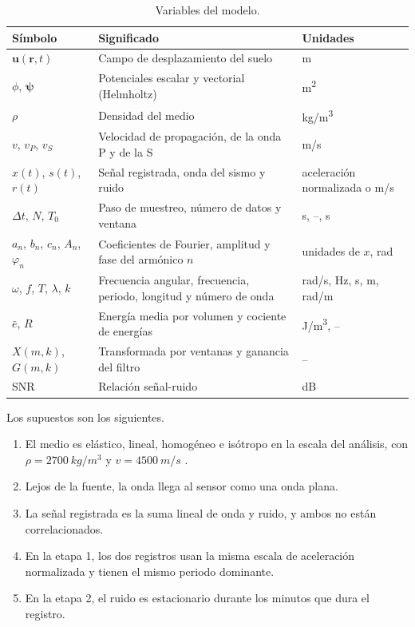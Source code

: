 \documentclass[11pt,letterpaper]{article}
\begin{document}
\begin{table}[H]
\centering
\small
\begin{tabular}{lll}
\toprule
Símbolo & Significado & Unidades\\
\midrule
$\mathbf{u}(\mathbf{r},t)$ & Campo de desplazamiento del suelo & \si{m}\\
$\phi$, $\boldsymbol{\psi}$ & Potenciales escalar y vectorial (Helmholtz) & \si{m^2}\\
$\rho$ & Densidad del medio & \si{kg/m^3}\\
$v$, $v_P$, $v_S$ & Velocidad de propagación, de la onda P y de la S & \si{m/s}\\
$x(t)$, $s(t)$, $r(t)$ & Señal registrada, onda del sismo y ruido & aceleración normalizada o \si{m/s}\\
$\Delta t$, $N$, $T_0$ & Paso de muestreo, número de datos y ventana & \si{s}, --, \si{s}\\
$a_n$, $b_n$, $c_n$, $A_n$, $\varphi_n$ & Coeficientes de Fourier, amplitud y fase del armónico $n$ & unidades de $x$, \si{rad}\\
$\omega$, $f$, $T$, $\lambda$, $k$ & Frecuencia angular, frecuencia, periodo, longitud y número de onda & \si{rad/s}, \si{Hz}, \si{s}, \si{m}, \si{rad/m}\\
$\bar e$, $R$ & Energía media por volumen y cociente de energías & \si{J/m^3}, --\\
$X(m,k)$, $G(m,k)$ & Transformada por ventanas y ganancia del filtro & --\\
SNR & Relación señal-ruido & \si{dB}\\
\bottomrule
\end{tabular}
\caption{Variables del modelo.}
\label{tab:var}
\end{table}

Los supuestos son los siguientes.
\begin{enumerate}
\item El medio es elástico, lineal, homogéneo e isótropo en la escala del análisis, con $\rho = \SI{2700}{kg/m^3}$ y $v = \SI{4500}{m/s}$ \parencite{expediente}.
\item Lejos de la fuente, la onda llega al sensor como una onda plana.
\item La señal registrada es la suma lineal de onda y ruido, y ambos no están correlacionados.
\item En la etapa 1, los dos registros usan la misma escala de aceleración normalizada y tienen el mismo periodo dominante.
\item En la etapa 2, el ruido es estacionario durante los minutos que dura el registro.
\end{enumerate}
\end{document}
